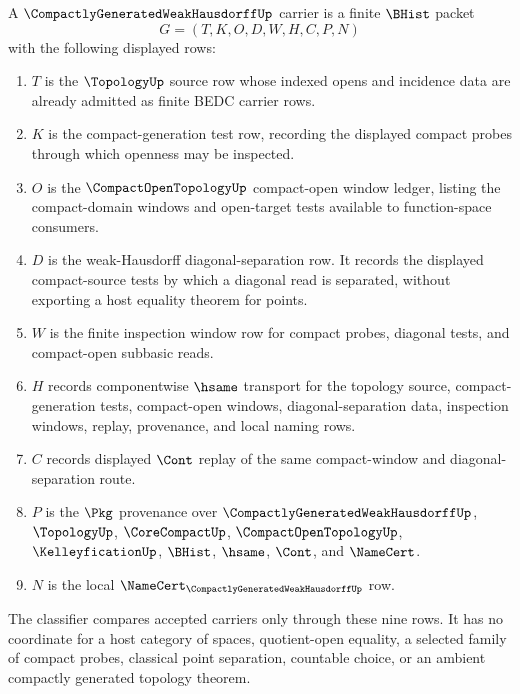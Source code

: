 \begin{definition}
\label{def:compactly-generated-weak-hausdorff-carrier}
A $\CompactlyGeneratedWeakHausdorffUp$ carrier is a finite $\BHist$ packet
$$
G=(T,K,O,D,W,H,C,P,N)
$$
with the following displayed rows:
\begin{enumerate}
\item $T$ is the $\TopologyUp$ source row whose indexed opens and incidence data are already admitted as finite BEDC carrier rows.
\item $K$ is the compact-generation test row, recording the displayed compact probes through which openness may be inspected.
\item $O$ is the $\CompactOpenTopologyUp$ compact-open window ledger, listing the compact-domain windows and open-target tests available to function-space consumers.
\item $D$ is the weak-Hausdorff diagonal-separation row. It records the displayed compact-source tests by which a diagonal read is separated, without exporting a host equality theorem for points.
\item $W$ is the finite inspection window row for compact probes, diagonal tests, and compact-open subbasic reads.
\item $H$ records componentwise $\hsame$ transport for the topology source, compact-generation tests, compact-open windows, diagonal-separation data, inspection windows, replay, provenance, and local naming rows.
\item $C$ records displayed $\Cont$ replay of the same compact-window and diagonal-separation route.
\item $P$ is the $\Pkg$ provenance over $\CompactlyGeneratedWeakHausdorffUp$, $\TopologyUp$, $\CoreCompactUp$, $\CompactOpenTopologyUp$, $\KelleyficationUp$, $\BHist$, $\hsame$, $\Cont$, and $\NameCert$.
\item $N$ is the local $\NameCert_{\CompactlyGeneratedWeakHausdorffUp}$ row.
\end{enumerate}
The classifier compares accepted carriers only through these nine rows. It has no coordinate for a host category of spaces, quotient-open equality, a selected family of compact probes, classical point separation, countable choice, or an ambient compactly generated topology theorem.
\end{definition}

